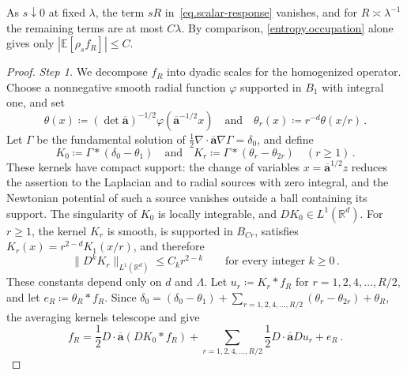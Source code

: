 \documentclass[11pt]{amsart}
\theoremstyle{definition}
\theoremstyle{remark}
\numberwithin{equation}{section}
\newcommand{\E}{\mathbb E}
\newcommand{\R}{\mathbb R}
\newcommand{\ahom}{\overline{\mathbf a}}
\begin{document}
As $s\downarrow0$ at fixed $\lambda$, the term $sR$ in~\eqref{eq.scalar-response} vanishes, and for $R\asymp\lambda^{-1}$ the remaining terms are at most $C\lambda$. By comparison, \eqref{entropy.occupation} alone gives only $|\E[\rho_sf_R]|\leq C$.

\begin{proof}
\emph{Step 1.} We decompose $f_R$ into dyadic scales for the homogenized operator. Choose a nonnegative smooth radial function $\varphi$ supported in $B_1$ with integral one, and set
\begin{equation*}
 \theta(x)\coloneqq(\det\ahom)^{-1/2}\varphi(\ahom^{-1/2}x)
 \quad\text{and}\quad \theta_r(x)\coloneqq r^{-d}\theta(x/r)\, .
\end{equation*}
Let $\Gamma$ be the fundamental solution of $\frac12\nabla\cdot\ahom\nabla\Gamma=\delta_0$, and define
\begin{equation}\label{eq.scalar-kernels}
 K_0\coloneqq\Gamma*(\delta_0-\theta_1)
 \quad\text{and}\quad K_r\coloneqq\Gamma*(\theta_r-\theta_{2r})\quad(r\geq1)\, .
\end{equation}
These kernels have compact support: the change of variables $x=\ahom^{1/2}z$ reduces the assertion to the Laplacian and to radial sources with zero integral, and the Newtonian potential of such a source vanishes outside a ball containing its support. The singularity of $K_0$ is locally integrable, and $DK_0\in L^1(\R^d)$. For $r\geq1$, the kernel $K_r$ is smooth, is supported in $B_{Cr}$, satisfies $K_r(x)=r^{2-d}K_1(x/r)$, and therefore
\begin{equation}\label{eq.scalar-kernel-bounds}
 \|D^kK_r\|_{L^1(\R^d)}\leq C_kr^{2-k}
 \qquad\text{for every integer }k\geq0\, .
\end{equation}
These constants depend only on $d$ and $\Lambda$. Let $u_r\coloneqq K_r*f_R$ for $r=1,2,4,\ldots,R/2$, and let $e_R\coloneqq\theta_R*f_R$. Since $\delta_0=(\delta_0-\theta_1)+\sum_{r=1,2,4,\ldots,R/2}(\theta_r-\theta_{2r})+\theta_R$, the averaging kernels telescope and give
\begin{equation}\label{eq.scalar-telescoping}
 f_R=\frac12D\cdot\ahom(DK_0*f_R)
 +\sum_{r=1,2,4,\ldots,R/2}\frac12D\cdot\ahom Du_r+e_R\, .
\end{equation}


\end{proof}
\end{document}
